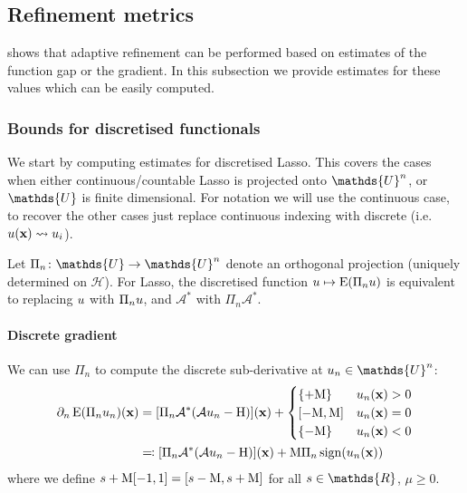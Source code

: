 \documentclass[10pt,a4paper,onecolumn]{article}
\numberwithin{equation}{section}
\let\F\mathds\let\C\mathcal\newcommand{\R}{\F{R}}\newcommand{\A}{\C{A}}
\newcommand{\op}[1]{\operatorname{#1}}\newcommand{\overtext}[2]{\stackrel{\text{#1}}{#2}}
\renewcommand{\vec}{\mathbf}
\newcommand{\UCmath}[1]{%
	\begingroup
	\ucmathlist\uppercase\expandafter{#1}%
	\endgroup
}
\newcommand{\ucmathlist}{%
	\def\alpha{\mathrm{A}}%
	\def\beta{\mathrm{B}}%
	\let\gamma=\Gamma
	\let\delta=\Delta
	\def\epsilon{\mathrm{E}}%
	\def\varepsilon{\mathrm{E}}%
	\def\zeta{\mathrm{Z}}%
	\def\eta{\mathrm{H}}%
	\let\theta=\Theta
	\let\vartheta=\Theta
	\def\iota{\mathrm{I}}%
	\def\kappa{\mathrm{K}}%
	\let\lambda=\Lambda
	\def\mu{\mathrm{M}}%
	\def\nu{\mathrm{N}}%
	\let\xi=\Xi
	\let\pi=\Pi
	\let\varpi=\Pi
	\def\rho{\mathrm{P}}%
	\def\varrho{\mathrm{P}}%
	\let\sigma=\Sigma
	\def\tau{\mathrm{T}}%
	\let\upsilon=\Upsilon
	\let\phi=\Phi
	\let\varphi=\Phi
	\def\chi{\mathrm{X}}%
	\let\psi=\Psi
	\let\omega=\Omega
}
\newcommand{\caps}[1]{\UCmath{#1}}
\newcommand*{\Func}[1]{%
	\IfEqCase{#1}{%
		{0}{\op{E}}%
		{1}{\op{F}}%
		{2}{\op{G}}%
		{3}{\op{H}}%
	}[\op{F}#1]%
}
\newcommand*{\varf}[1]{%
	\IfEqCase{#1}{%
		{0}{u}%
		{1}{v}%
		{2}{w}%
	}[u#1]%
}
\newcommand*{\spcf}[1]{%
	\IfEqCase{#1}{%
		{0}{\F{U}}%
		{1}{\F{V}}%
		{2}{\F{W}}%
	}[\F{U}#1]%
}
\newcommand*{\varx}[1]{%
	\IfEqCase{#1}{%
		{0}{x}%
		{1}{y}%
		{2}{z}%
		{3}{r}%
	}[x#1]%
}
\newcommand*{\vart}[1]{%
	\IfEqCase{#1}{%
		{0}{s}%
		{1}{t}%
	}[t#1]%
}
\newcommand*{\Varx}[1]{\caps{\varx{#1}}}
\newcommand*{\vvarx}[1]{\vec{\varx{#1}}}\newcommand*{\vVarx}[1]{\vec{\Varx{#1}}}
\begin{document}
\subsection{Refinement metrics}\label{sec: Lasso gap and gradient}
 shows that adaptive refinement can be performed based on estimates of the function gap or the gradient. In this subsection we provide estimates for these values which can be easily computed.

\subsubsection{Bounds for discretised functionals}\label{sec: bound discrete}
We start by computing estimates for discretised Lasso. This covers the cases when either continuous/countable Lasso is projected onto $\spcf0^n$, or $\spcf0$ is finite dimensional. For notation we will use the continuous case, to recover the other cases just replace continuous indexing with discrete (i.e. $\varf0(\vvarx0) \leadsto \varf0_i$).

Let $\Pi_n\colon\spcf0\to\spcf0^n$ denote an orthogonal projection (uniquely determined on $\C H$). For Lasso, the discretised function $\varf0\mapsto\Func0(\Pi_n\varf0)$ is equivalent to replacing $\varf0$ with $\Pi_n\varf0$, and $\A^*$ with $\Pi_n\A^*$. 

\paragraph{Discrete gradient}
We can use $\Pi_n$ to compute the discrete sub-derivative at $\varf0_n\in\spcf0^n$:
\begin{align}
	\partial_n \Func0(\Pi_n\varf0_n)(\vvarx0) &= [\Pi_n\A^*(\A\varf0_n-\vdata0)](\vvarx0) + \begin{cases}
		\{+\mu\} & \varf0_n(\vvarx0)>0 \\ [-\mu,\mu] & \varf0_n(\vvarx0)=0 
		\\\{-\mu\} & \varf0_n(\vvarx0)<0 
	\end{cases} 
	\\&\eqqcolon [\Pi_n\A^*(\A\varf0_n-\vdata0)](\vvarx0) + \mu\Pi_n\sign(\varf0_n(\vvarx0))
\end{align}
where we define $\vart0+\mu[-1,1] = [\vart0-\mu,\vart0+\mu]$ for all $\vart0\in\R$, $\mu\geq0$. 
\end{document}
